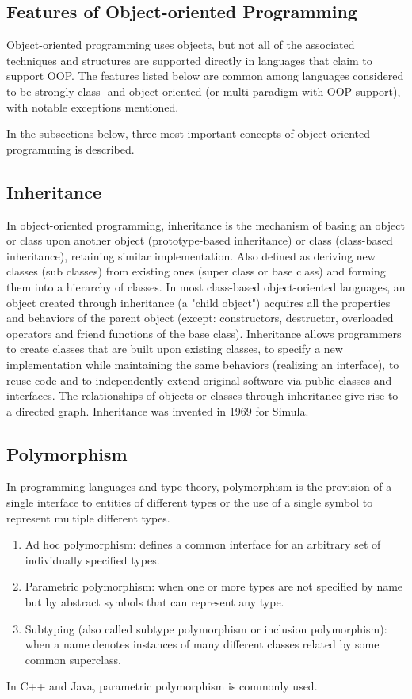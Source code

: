 \documentclass[a4paper]{report}
\begin{document}
\subsection{Features of Object-oriented Programming}
Object-oriented programming uses objects, but not all of the associated techniques and structures are supported directly in languages that claim to support OOP. The features listed below are common among languages considered to be strongly class- and object-oriented (or multi-paradigm with OOP support), with notable exceptions mentioned.
\par
In the subsections below, three most important concepts of object-oriented programming is described.

\subsection{Inheritance}
In object-oriented programming, inheritance is the mechanism of basing an object or class upon another object (prototype-based inheritance) or class (class-based inheritance), retaining similar implementation. Also defined as deriving new classes (sub classes) from existing ones (super class or base class) and forming them into a hierarchy of classes. In most class-based object-oriented languages, an object created through inheritance (a "child object") acquires all the properties and behaviors of the parent object (except: constructors, destructor, overloaded operators and friend functions of the base class). Inheritance allows programmers to create classes that are built upon existing classes, to specify a new implementation while maintaining the same behaviors (realizing an interface), to reuse code and to independently extend original software via public classes and interfaces. The relationships of objects or classes through inheritance give rise to a directed graph. Inheritance was invented in 1969 for Simula.

\subsection{Polymorphism}
In programming languages and type theory, polymorphism is the provision of a single interface to entities of different types or the use of a single symbol to represent multiple different types.
\begin{enumerate}
\item Ad hoc polymorphism: defines a common interface for an arbitrary set of individually specified types.
\item Parametric polymorphism: when one or more types are not specified by name but by abstract symbols that can represent any type.
\item Subtyping (also called subtype polymorphism or inclusion polymorphism): when a name denotes instances of many different classes related by some common superclass.
\end{enumerate}
\par
In C++ and Java, parametric polymorphism is commonly used.
\end{document}
